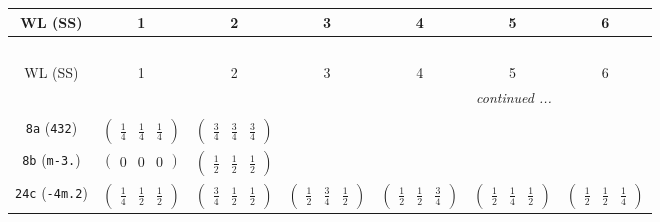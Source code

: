 \documentclass[fleqn,9pt,landscape]{jsarticle}
\begin{document}
\begin{center}
\renewcommand{\arraystretch}{1.2}
\begin{longtable}{ccccccc}
 \hline \hline
WL (SS) & 1 & 2 & 3 & 4 & 5 & 6 \\ \hline \endfirsthead

\multicolumn{6}{l}{\tablename\ \thetable{}} \\
 \hline \hline
WL (SS) & 1 & 2 & 3 & 4 & 5 & 6 \\ \hline \endhead

 \hline \hline
\multicolumn{6}{r}{\footnotesize\it continued ...} \\ \endfoot

 \hline \hline
\multicolumn{6}{r}{} \\ \endlastfoot

{\tt 8a} ({\tt 432}) & $ \begin{pmatrix} \frac{1}{4} & \frac{1}{4} & \frac{1}{4} \end{pmatrix} $ & $ \begin{pmatrix} \frac{3}{4} & \frac{3}{4} & \frac{3}{4} \end{pmatrix} $ & $  $ & $  $ & $  $ & $  $ \\ \hline
{\tt 8b} ({\tt m-3.}) & $ \begin{pmatrix} 0 & 0 & 0 \end{pmatrix} $ & $ \begin{pmatrix} \frac{1}{2} & \frac{1}{2} & \frac{1}{2} \end{pmatrix} $ & $  $ & $  $ & $  $ & $  $ \\ \hline
{\tt 24c} ({\tt -4m.2}) & $ \begin{pmatrix} \frac{1}{4} & \frac{1}{2} & \frac{1}{2} \end{pmatrix} $ & $ \begin{pmatrix} \frac{3}{4} & \frac{1}{2} & \frac{1}{2} \end{pmatrix} $ & $ \begin{pmatrix} \frac{1}{2} & \frac{3}{4} & \frac{1}{2} \end{pmatrix} $ & $ \begin{pmatrix} \frac{1}{2} & \frac{1}{2} & \frac{3}{4} \end{pmatrix} $ & $ \begin{pmatrix} \frac{1}{2} & \frac{1}{4} & \frac{1}{2} \end{pmatrix} $ & $ \begin{pmatrix} \frac{1}{2} & \frac{1}{2} & \frac{1}{4} \end{pmatrix} $ \\ \hline

\end{longtable}
\end{center}
\end{document}
